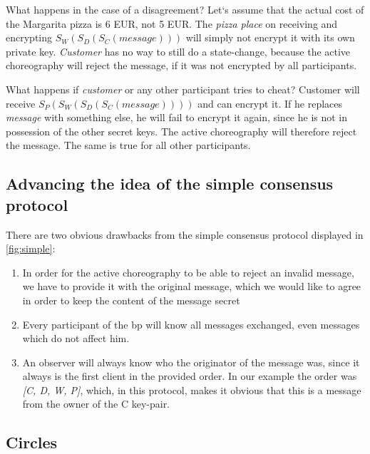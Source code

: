 \documentclass[runningheads]{llncs}
\begin{document}
What happens in the case of a disagreement? Let`s assume that the actual cost of the Margarita pizza is 6 EUR, not 5 EUR. The \textit{pizza place} on receiving and encrypting  $S_W(S_D(S_C(message)))$ will simply not encrypt it with its own private key. \textit{Customer} has no way to still do a state-change, because the active choreography will reject the message, if it was not encrypted by all participants. 

What happens if \textit{customer} or any other participant tries to cheat? Customer will receive $S_P(S_W(S_D(S_C(message))))$ and can encrypt it. If he replaces \textit{message} with something else, he will fail to encrypt it again, since he is not in possession of the other secret keys. The active choreography will therefore reject the message. The same is true for all other participants. 


\subsection{Advancing the idea of the simple consensus protocol}

There are two obvious drawbacks from the simple consensus protocol displayed in \ref{fig:simple}: 

\begin{enumerate}
    \item In order for the active choreography to be able to reject an invalid message, we have to provide it with the original message, which we would like to agree in order to keep the content of the message secret
    \item Every participant of the bp will know all messages exchanged, even messages which do not affect him. 
    \item An observer will always know who the originator of the message was, since it always is the first client in the provided order. In our example the order was \textit{[C, D, W, P]}, which, in this protocol, makes it obvious that this is a message from the owner of the C key-pair.
\end{enumerate}



\subsection{Circles}
\end{document}
